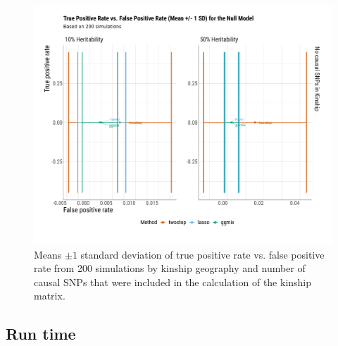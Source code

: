 \documentclass[12pt,letter]{article}\usepackage[]{graphicx}\usepackage[]{color}
\newenvironment{knitrout}{}{} %
\begin{document}
\begin{knitrout}\scriptsize
{}\color{fgcolor}\begin{figure}[H]

{\centering \includegraphics[width=1\linewidth]{figure/plot-tpr-fpr-sim-null-model-1} 

}

\caption[Means $\pm 1$ standard deviation of true positive rate vs]{Means $\pm 1$ standard deviation of true positive rate vs. false positive rate from 200 simulations by kinship geography and number of causal SNPs that were included in the calculation of the kinship matrix.}\label{fig:plot-tpr-fpr-sim-null-model}
\end{figure}


\end{knitrout}


\subsection{Run time}
\end{document}
